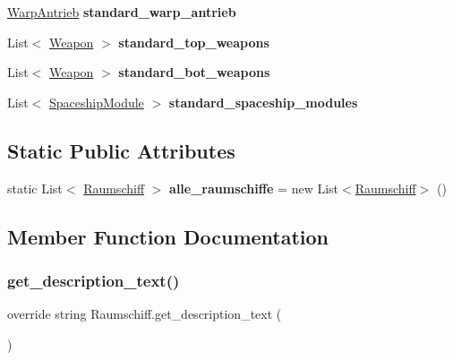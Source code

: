 \begin{DoxyCompactItemize}
\item 
\mbox{\label{class_raumschiff_a86f9b365896d5e64d4a5d43d260ad65c}} 
\hyperlink{class_warp_antrieb}{Warp\+Antrieb} {\bfseries standard\+\_\+warp\+\_\+antrieb}
\item 
\mbox{\label{class_raumschiff_ad35f68ef4912c0079655f6c225c6e9f7}} 
List$<$ \hyperlink{class_weapon}{Weapon} $>$ {\bfseries standard\+\_\+top\+\_\+weapons}
\item 
\mbox{\label{class_raumschiff_a0322927f79477ea8c487779886ca75d9}} 
List$<$ \hyperlink{class_weapon}{Weapon} $>$ {\bfseries standard\+\_\+bot\+\_\+weapons}
\item 
\mbox{\label{class_raumschiff_ab52861352215fae036bb51050cc72f72}} 
List$<$ \hyperlink{class_spaceship_module}{Spaceship\+Module} $>$ {\bfseries standard\+\_\+spaceship\+\_\+modules}
\end{DoxyCompactItemize}
\subsection*{Static Public Attributes}
\begin{DoxyCompactItemize}
\item 
\mbox{\label{class_raumschiff_a890f06bda07e46e70a5180e7d0c83d92}} 
static List$<$ \hyperlink{class_raumschiff}{Raumschiff} $>$ {\bfseries alle\+\_\+raumschiffe} = new List$<$\hyperlink{class_raumschiff}{Raumschiff}$>$ ()
\end{DoxyCompactItemize}


\subsection{Member Function Documentation}
\mbox{\label{class_raumschiff_a9aa65a7d3deb846709b85be4d157d621}} 
\subsubsection{\texorpdfstring{get\+\_\+description\+\_\+text()}{get\_description\_text()}}
{\footnotesize\ttfamily override string Raumschiff.\+get\+\_\+description\+\_\+text (\begin{DoxyParamCaption}{ }\end{DoxyParamCaption})\hspace{0.3cm}{\ttfamily [virtual]}}




